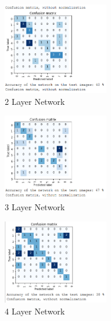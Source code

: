 \documentclass{report}
\begin{document}
    \begin{figure}[h!]
        \centering
        \begin{subfigure}[t]{0.45\textwidth}
            \centering
            \includegraphics[width=0.5\textwidth]{2_layers}
            \caption{2 Layer Network}
        \end{subfigure}
        \begin{subfigure}[t]{0.45\textwidth}
            \centering
            \includegraphics[width=0.5\textwidth]{3_layers}
            \caption{3 Layer Network}
        \end{subfigure}
        \begin{subfigure}[t]{0.45\textwidth}
            \centering
            \includegraphics[width=0.5\textwidth]{4_layers}
            \caption{4 Layer Network}
        \end{subfigure}
        \begin{subfigure}[t]{0.45\textwidth}

\end{subfigure}
\end{figure}
\end{document}
